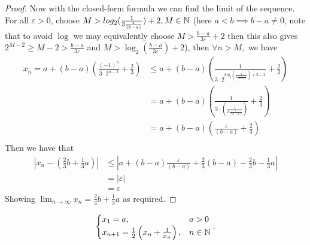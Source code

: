 \documentclass{homework}
\newcommand{\N}{\bb{N}} %
\newcommand{\ra}{\rightarrow}
\newcommand{\?}{\stackrel{?}{=}}
\newcommand{\ep}{\varepsilon}
\theoremstyle{definition}
\begin{document}
\begin{proof}
    Now with the closed-form formula we can find the limit of the sequence. For all $\ep>0$, choose $M>log_2(\frac1{3\frac{\ep}{(b-a)}})+2, M\in\N$ (here $a<b\implies b-a\neq0$, note that to avoid $\log$ we may equivalently choose $M>\frac{b-a}{3\ep}+2$ then this also gives $2^{M-2}\geq M-2>\frac{b-a}{3\ep}$ and $M>\log_2(\frac{b-a}{3\ep})+2$), then $\forall n>M,$ we have \begin{align*}
        x_n=a+(b-a)\left(\frac{(-1)^n}{3\cdot2^{n-2}}+\frac23\right) &\leq  a+(b-a)\left(\frac{1}{3\cdot2^{log_2(\frac1{3\frac{\ep}{(b-a)}})+2-2}}+\frac23\right)\\
        &= a+(b-a)\left(\frac{1}{3\cdot (\frac1{3\frac{\ep}{(b-a)}})}+\frac23\right)\\
        &= a+(b-a)\left(\frac{\ep}{(b-a)}+\frac23\right)\\
    \end{align*}
    Then we have that \begin{align*}
        |x_n-(\frac23b+\frac13a)| &\leq |a+(b-a)\frac{\ep}{(b-a)} + \frac23(b-a) - \frac23b - \frac13a|\\
        &= |\ep|\\
        &= \ep
    \end{align*} 
    Showing $\lim_{n\ra\infty}x_n=\frac23b+\frac13a$ as required.
    \end{proof}


\question[2] \[
\begin{cases}
    x_1=a, &a>0\\
    x_{n+1}=\frac12\left(x_n+\frac1{x_n}\right), &n\in\N
\end{cases}.
\]
\end{document}
